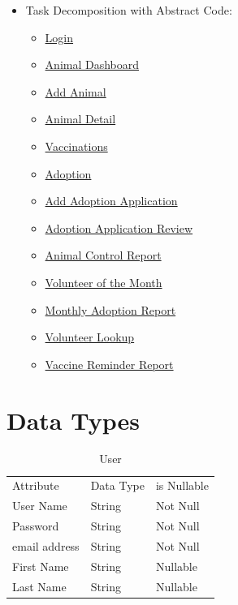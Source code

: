 \documentclass[a4paper]{article}
\begin{document}
\begin{itemize}
	\item Task Decomposition with Abstract Code:
	\begin{itemize}
		\item \hyperlink{login}{Login}
		\item \hyperlink{animal_dashboard}{Animal Dashboard}
		\item \hyperlink{add_animal}{Add Animal}
		\item \hyperlink{animal_detail}{Animal Detail}
		\item \hyperlink{vaccinations}{Vaccinations}
		\item \hyperlink{adoption}{Adoption}
		\item \hyperlink{add_adoption_app}{Add Adoption Application}
		\item \hyperlink{adoption_app_review}{Adoption Application Review}
		\item \hyperlink{animal_control_report}{Animal Control Report}
		\item \hyperlink{volunteer_of_the_month}{Volunteer of the Month}
		\item \hyperlink{monthly_adoption_report}{Monthly Adoption Report}
		\item \hyperlink{volunteer_lookup}{Volunteer Lookup}
		\item \hyperlink{vaccine_reminder_report}{Vaccine Reminder Report}
	\end{itemize}

\end{itemize}

\pagebreak

\hypertarget{data_types}{\section{Data Types}}

\begin{table}[H]
		\centering
	\begin{tabular}{|l|l|l|}
		Attribute     & Data Type & is Nullable \\
		User Name     & String    & Not Null \\
		Password      & String    & Not Null \\
		email address & String    & Not Null \\
		First Name    & String    & Nullable \\
		Last Name     & String    & Nullable
	\end{tabular}
\caption{User}
\end{table}
\end{document}
